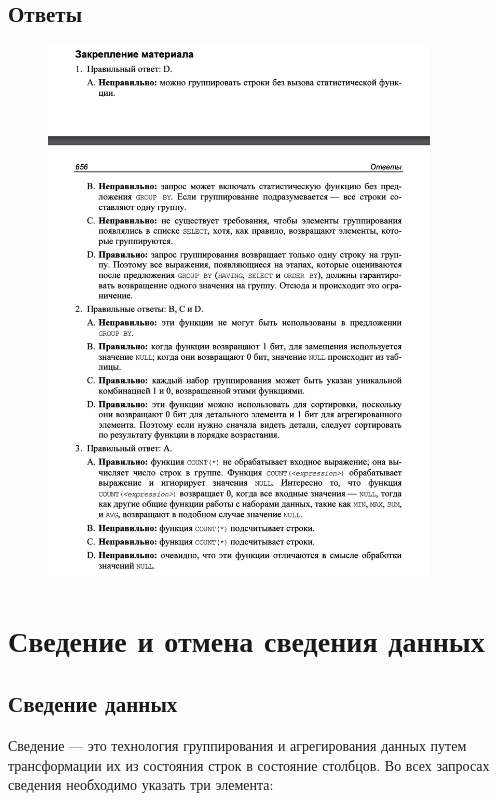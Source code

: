 \subsection*{Ответы}

\begin{figure}[h!]
	\begin{center}
		\includegraphics[width=0.9\textwidth]{img/ans11.png}
	\end{center}
	\captionsetup{justification=centering}
\end{figure}
\clearpage


\section{Сведение и отмена сведения данных}

\subsection{Сведение данных}

Сведение — это технология группирования и агрегирования данных путем трансформации их из состояния строк в состояние столбцов. Во всех запросах сведения
необходимо указать три элемента:

